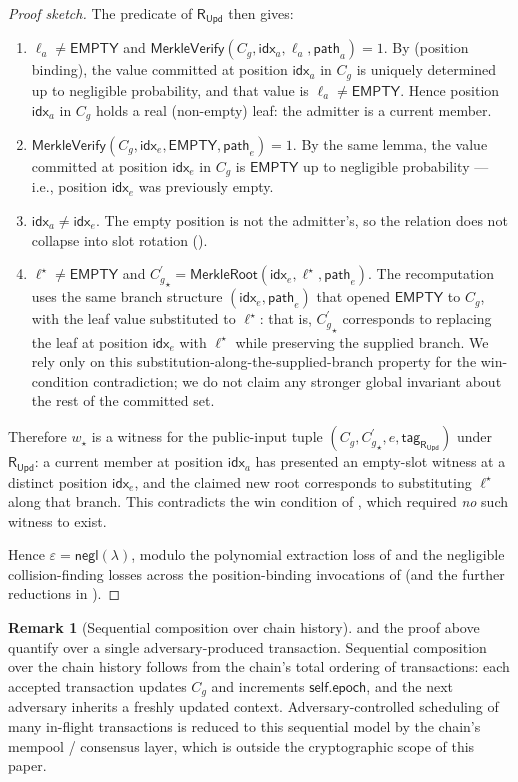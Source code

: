 \documentclass[11pt,a4paper]{article}
\theoremstyle{plain}
\theoremstyle{definition}
\newtheorem{remark}{Remark}
\newcommand{\Cg}{C_g}
\newcommand{\Cgp}{{C_g^{\prime}}}
\newcommand{\RUpd}{\mathsf{R}_{\mathsf{Upd}}}
\newcommand{\negl}{\mathsf{negl}}
\newcommand{\Empty}{\mathsf{EMPTY}}
\newcommand{\MerkleVerify}{\mathsf{MerkleVerify}}
\newcommand{\MerkleRoot}{\mathsf{MerkleRoot}}
\newcommand{\Idx}{\mathsf{idx}}
\newcommand{\Pth}{\mathsf{path}}
\begin{document}
\begin{proof}[Proof sketch]
The predicate of $\RUpd$ then gives:
\begin{enumerate}
\item $\ell_a \ne \Empty$ and
  $\MerkleVerify(\Cg, \Idx_a, \ell_a, \Pth_a) = 1$. By
   (position binding), the value committed at
  position $\Idx_a$ in $\Cg$ is uniquely determined up to
  negligible probability, and that value is $\ell_a \ne \Empty$.
  Hence position $\Idx_a$ in $\Cg$ holds a real (non-empty) leaf:
  the admitter is a current member.
\item $\MerkleVerify(\Cg, \Idx_e, \Empty, \Pth_e) = 1$. By the
  same lemma, the value committed at position $\Idx_e$ in $\Cg$
  is $\Empty$ up to negligible probability --- i.e., position
  $\Idx_e$ was previously empty.
\item $\Idx_a \ne \Idx_e$. The empty position is not the
  admitter's, so the relation does not collapse into slot
  rotation ().
\item $\ell^{\star} \ne \Empty$ and
  $\Cgp_{\star} = \MerkleRoot(\Idx_e, \ell^{\star}, \Pth_e)$.
  The recomputation uses the same branch structure
  $(\Idx_e, \Pth_e)$ that opened $\Empty$ to $\Cg$, with the leaf
  value substituted to $\ell^{\star}$: that is, $\Cgp_{\star}$
  corresponds to replacing the leaf at position $\Idx_e$ with
  $\ell^{\star}$ while preserving the supplied branch. We rely
  only on this substitution-along-the-supplied-branch property
  for the win-condition contradiction; we do not claim any
  stronger global invariant about the rest of the committed set.
\end{enumerate}

Therefore $w_{\star}$ is a witness for the public-input tuple
$(\Cg, \Cgp_{\star}, e, \mathsf{tag}_{\RUpd})$ under
$\RUpd$: a current member at position $\Idx_a$ has presented an
empty-slot witness at a distinct position $\Idx_e$, and the
claimed new root corresponds to substituting $\ell^{\star}$ along
that branch. This contradicts the win condition of
, which required \emph{no} such witness to exist.

Hence $\varepsilon = \negl(\lambda)$, modulo the polynomial
extraction loss of  and the negligible
collision-finding losses across the position-binding invocations
of  (and the further reductions in
).
\end{proof}

\begin{remark}[Sequential composition over chain history]
\label{rem:seq}
 and the proof above quantify over a single
adversary-produced transaction. Sequential composition over the
chain history follows from the chain's total ordering of
transactions: each accepted transaction updates $\Cg$ and
increments $\mathsf{self.epoch}$, and the next adversary inherits
a freshly updated context. Adversary-controlled scheduling of
many in-flight transactions is reduced to this sequential model
by the chain's mempool / consensus layer, which is outside the
cryptographic scope of this paper.
\end{remark}
\end{document}
